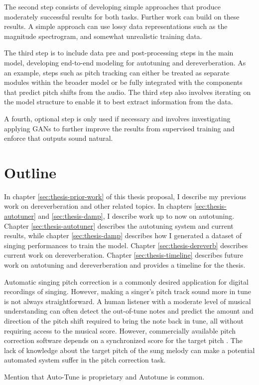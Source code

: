 The second step consists of developing simple approaches that produce moderately successful results for both tasks. Further work can build on these results. A simple approach can use lossy data representations such as the magnitude spectrogram, and somewhat unrealistic training data. 

The third step is to include data pre and post-processing steps in the main model, developing end-to-end modeling for autotuning and dereverberation. As an example, steps such as pitch tracking can either be treated as separate modules within the broader model or be fully integrated with the components that predict pitch shifts from the audio. The third step also involves iterating on the model structure to enable it to best extract information from the data. 

A fourth, optional step is only used if necessary and involves investigating applying GANs to further improve the results from supervised training and enforce that outputs sound natural.

\section{Outline}
In chapter \ref{sec:thesis-prior-work} of this thesis proposal, I describe my previous work on dereverberation and other related topics. In chapters \ref{sec:thesis-autotuner} and \ref{sec:thesis-damp}, I describe work up to now on autotuning. Chapter \ref{sec:thesis-autotuner} describes the autotuning system and current results, while chapter \ref{sec:thesis-damp} describes how I generated a dataset of singing performances to train the model. Chapter \ref{sec:thesis-dereverb} describes current work on dereverberation. Chapter \ref{sec:thesis-timeline} describes future work on autotuning and dereverberation and provides a timeline for the thesis.


Automatic singing pitch correction is a commonly desired application for digital recordings of singing. However, making a singer's pitch track sound more in tune is not always straightforward. A human listener with a moderate level of musical understanding can often detect the out-of-tune notes and predict the amount and direction of the pitch shift required to bring the note back in tune, all without requiring access to the musical score. However, commercially available pitch correction software depends on a synchronized score for the target pitch \cite{antares:2016}. The lack of knowledge about the target pitch of the sung melody can make a potential automated system suffer in the pitch correction task.

Mention that Auto-Tune is proprietary and Autotune is common. 